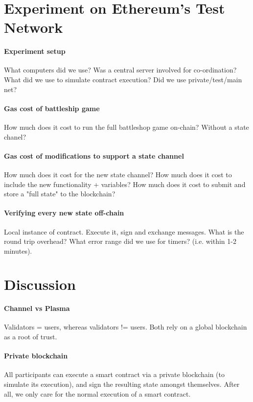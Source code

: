\documentclass{llncs}
\begin{document}
\section{Experiment on Ethereum's Test Network}

\paragraph{Experiment setup} 

What computers did we use? Was a central server involved for co-ordination? What did we use to simulate contract execution? Did we use private/test/main net? 

\paragraph{Gas cost of battleship game} 

How much does it cost to run the full battleshop game on-chain? Without a state chanel? 

\paragraph{Gas cost of modifications to support a state channel} 

How much does it cost for the new state channel? How much does it cost to include the new functionality + variables? How much does it cost to submit and store a "full state" to the blockchain?  

\paragraph{Verifying every new state off-chain} 

Local instance of contract. Execute it, sign and exchange messages. What is the round trip overhead? What error range did we use for timers? (i.e. within 1-2 minutes). 

\section{Discussion} 

\paragraph{Channel vs Plasma} Validators = users, whereas validators != users. Both rely on a global blockchain as a root of trust. 

\paragraph{Private blockchain} All participants can execute a smart contract via a private blockchain (to simulate its execution), and sign the resulting state amongst themselves. After all, we only care for the normal execution of a smart contract. 
\end{document}
